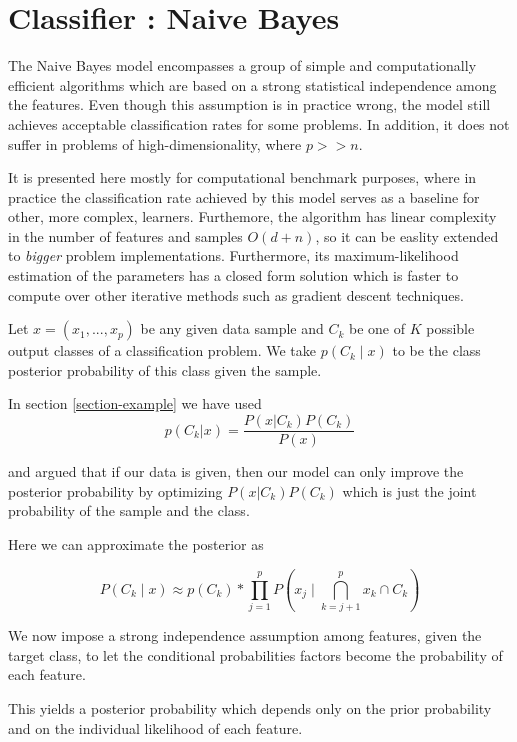 \section{Classifier : Naive Bayes}

The Naive Bayes model encompasses a group of simple and computationally efficient algorithms which are based on a strong statistical independence among the features. Even though this assumption is in practice wrong, the model still achieves acceptable classification rates for some problems. In addition, it does not suffer in problems of high-dimensionality, where $p >> n$.  

It is presented here mostly for computational benchmark purposes, where in practice the classification rate achieved by this model serves as a baseline for other, more complex, learners. Furthemore, the algorithm has linear  complexity in the number of features and samples $O(d+n)$, so it can be easlity extended to \textit{bigger} problem implementations. Furthermore, its maximum-likelihood estimation of the parameters has a closed form solution which is faster to compute over other iterative methods such as gradient descent techniques.

Let $x = (x_1,...,x_p)$ be any given data sample and $C_k$ be one of $K$ possible output classes of a classification problem. We take $p(C_k \mid x)$  to be the  class posterior probability of this class given the sample. 

In section \ref{section-example}
we have used 
\[
p(C_k| x) = \frac{P(x|C_k)P(C_k)}{P(x)}
\]\label{equation-posteriorProbabilties}

and argued that if our data is given, then our model can only improve the posterior probability by optimizing $P(x|C_k)P(C_k)$ which is just the joint probability of the sample and the class. 

Here we can approximate the posterior as

\[
P(C_k \mid x) \approx p(C_k) * \prod_{j=1}^{p}    P(x_j \mid \bigcap_{k=j+1}^{p} x_k \cap C_k)
\]\label{equation-posteriorProbabilityDecomposition1}

We now impose a strong independence assumption among features, given the target class, to let the conditional probabilities factors become the probability of each feature. %

This yields a posterior probability which depends only on the prior probability and on the individual likelihood of each feature.

